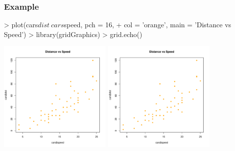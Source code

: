 \documentclass{beamer}
\begin{document}
\begin{frame}[fragile]
\frametitle{Example}
\begin{Schunk}
\begin{Sinput}
> plot(cars$dist ~ cars$speed, pch = 16, 
+      col = 'orange', main = 'Distance vs Speed')
> library(gridGraphics)
> grid.echo()
\end{Sinput}
\end{Schunk}
\begin{center}
  \includegraphics[height = 5.5cm, width = 5.5cm]{plot/intro_1.pdf}
  \includegraphics[height = 5.5cm, width = 5.5cm]{plot/intro_2.pdf}
\end{center}
\end{frame}

\end{document}
